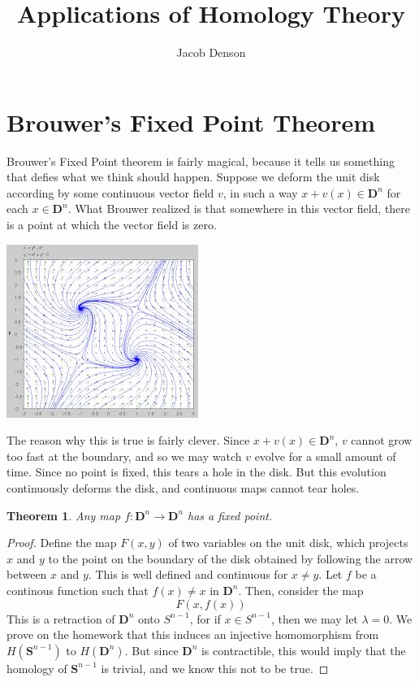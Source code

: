 \documentclass{article}
\title{Applications of Homology Theory}
\author{Jacob Denson}
\theoremstyle{plain}
\newtheorem{theorem}{Theorem}
\begin{document}
\maketitle

\section{Brouwer's Fixed Point Theorem}

Brouwer's Fixed Point theorem is fairly magical, because it tells us something that defies what we think should happen. Suppose we deform the unit disk according by some continuous vector field $v$, in such a way $x + v(x) \in \mathbf{D}^n$ for each $x \in \mathbf{D}^n$. What Brouwer realized is that somewhere in this vector field, there is a point at which the vector field is zero.

\begin{center}
\includegraphics[scale=0.4]{vectorField.jpg}
\end{center}


The reason why this is true is fairly clever. Since $x + v(x) \in \mathbf{D}^n$, $v$ cannot grow too fast at the boundary, and so we may watch $v$ evolve for a small amount of time. Since no point is fixed, this tears a hole in the disk. But this evolution continuously deforms the disk, and continuous maps cannot tear holes.

\begin{theorem}
    Any map $f: \mathbf{D}^n \to \mathbf{D}^n$ has a fixed point.
\end{theorem}
\begin{proof}
Define the map $F(x,y)$ of two variables on the unit disk, which projects $x$ and $y$ to the point on the boundary of the disk obtained by following the arrow between $x$ and $y$. This is well defined and continuous for $x \neq y$. Let $f$ be a continous function such that $f(x) \neq x$ in $\mathbf{D}^n$. Then, consider the map
%
\[ F(x,f(x)) \]
%
This is a retraction of $\mathbf{D}^n$ onto $S^{n-1}$, for if $x \in S^{n-1}$, then we may let $\lambda = 0$. We prove on the homework that this induces an injective homomorphism from $H(\mathbf{S}^{n-1})$ to $H(\mathbf{D}^n)$. But since $\mathbf{D}^n$ is contractible, this would imply that the homology of $\mathbf{S}^{n-1}$ is trivial, and we know this not to be true.
\end{proof}
\end{document}
